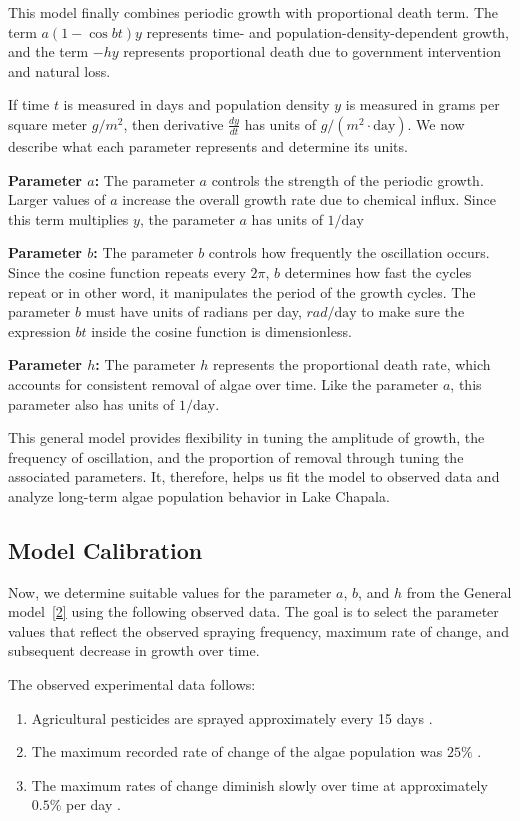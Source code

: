 \documentclass[11pt]{article}
\begin{document}
This model finally combines periodic growth with proportional death term. The term $a(1-\cos{bt})y$ represents time- and population-density-dependent growth, and the term $-hy$ represents proportional death due to government intervention and natural loss.

If time $t$ is measured in days and population density $y$ is measured in grams per square meter $g/m^2$, then derivative $\frac{dy}{dt}$ has units of $g/(m^2\cdot \text{day})$. We now describe what each parameter represents and determine its units.

\textbf{Parameter $a$:} The parameter $a$ controls the strength of the periodic growth. Larger values of $a$ increase the overall growth rate due to chemical influx. Since this term multiplies $y$, the parameter $a$ has units of $1/\text{day}$

\textbf{Parameter $b$:} The parameter $b$ controls how frequently the oscillation occurs. Since the cosine function repeats every $2\pi$, $b$ determines how fast the cycles repeat or in other word, it manipulates the period of the growth cycles. The parameter $b$ must have units of radians per day, $rad/\text{day}$ to make sure the expression $bt$ inside the cosine function is dimensionless.

\textbf{Parameter $h$:} The parameter $h$ represents the proportional death rate, which accounts for consistent removal of algae over time. Like the parameter $a$, this parameter also has units of $1/\text{day}$.

This general model provides flexibility in tuning the amplitude of growth, the frequency of oscillation, and the proportion of removal through tuning the associated parameters. It, therefore, helps us fit the model to observed data and analyze long-term algae population behavior in Lake Chapala.

\subsection{Model Calibration}

Now, we determine suitable values for the parameter $a$, $b$, and $h$ from the General model~\ref{2} using the following observed data. The goal is to select the parameter values that reflect the observed spraying frequency, maximum rate of change, and subsequent decrease in growth over time.

The observed experimental data follows:
\begin{enumerate}
    \item Agricultural pesticides are sprayed approximately every 15 days \cite{harwood-algae}.
    \item The maximum recorded rate of change of the algae population was $25\%$ \cite{harwood-algae}.
    \item The maximum rates of change diminish slowly over time at approximately $0.5\%$ per day \cite{harwood-algae}.
\end{enumerate}
\end{document}
